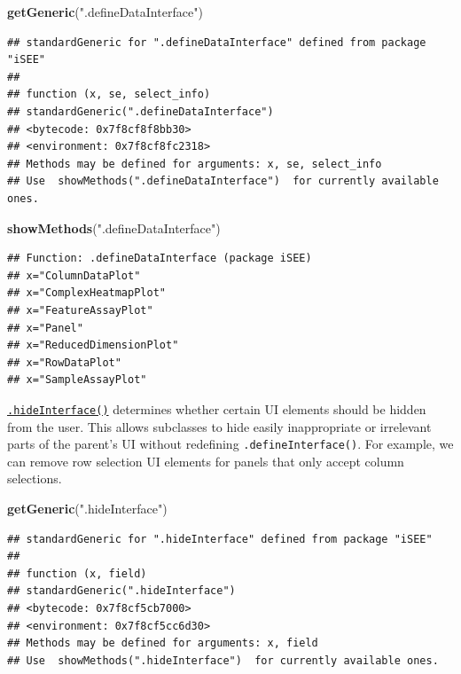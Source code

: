 \documentclass[
]{book}
\newenvironment{Shaded}{\begin{snugshade}}{\end{snugshade}}
\newcommand{\KeywordTok}[1]{\textcolor[rgb]{0.13,0.29,0.53}{\textbf{#1}}}
\newcommand{\NormalTok}[1]{#1}
\newcommand{\StringTok}[1]{\textcolor[rgb]{0.31,0.60,0.02}{#1}}
\begin{document}
\begin{Shaded}
\begin{Highlighting}[]
\KeywordTok{getGeneric}\NormalTok{(}\StringTok{".defineDataInterface"}\NormalTok{)}
\end{Highlighting}
\end{Shaded}

\begin{verbatim}
## standardGeneric for ".defineDataInterface" defined from package "iSEE"
## 
## function (x, se, select_info) 
## standardGeneric(".defineDataInterface")
## <bytecode: 0x7f8cf8f8bb30>
## <environment: 0x7f8cf8fc2318>
## Methods may be defined for arguments: x, se, select_info
## Use  showMethods(".defineDataInterface")  for currently available ones.
\end{verbatim}

\begin{Shaded}
\begin{Highlighting}[]
\KeywordTok{showMethods}\NormalTok{(}\StringTok{".defineDataInterface"}\NormalTok{)}
\end{Highlighting}
\end{Shaded}

\begin{verbatim}
## Function: .defineDataInterface (package iSEE)
## x="ColumnDataPlot"
## x="ComplexHeatmapPlot"
## x="FeatureAssayPlot"
## x="Panel"
## x="ReducedDimensionPlot"
## x="RowDataPlot"
## x="SampleAssayPlot"
\end{verbatim}

\href{https://isee.github.io/iSEE/reference/interface-generics.html}{\texttt{.hideInterface()}} determines whether certain UI elements should be hidden from the user.
This allows subclasses to hide easily inappropriate or irrelevant parts of the parent's UI without redefining \texttt{.defineInterface()}.
For example, we can remove row selection UI elements for panels that only accept column selections.

\begin{Shaded}
\begin{Highlighting}[]
\KeywordTok{getGeneric}\NormalTok{(}\StringTok{".hideInterface"}\NormalTok{)}
\end{Highlighting}
\end{Shaded}

\begin{verbatim}
## standardGeneric for ".hideInterface" defined from package "iSEE"
## 
## function (x, field) 
## standardGeneric(".hideInterface")
## <bytecode: 0x7f8cf5cb7000>
## <environment: 0x7f8cf5cc6d30>
## Methods may be defined for arguments: x, field
## Use  showMethods(".hideInterface")  for currently available ones.
\end{verbatim}
\end{document}

